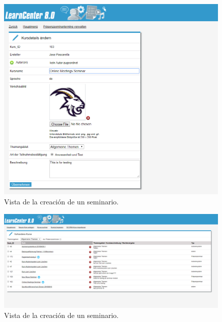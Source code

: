 \begin{figure}[h]
	\begin{center}
		\includegraphics[width=\textwidth]{screenshots/creacion_seminario.png}
		\caption{Vista de la creación de un seminario.} \label{fig:creacionSeminario}
	\end{center}
\end{figure}

\begin{figure}[h]
	\begin{center}
		\includegraphics[width=\textwidth]{screenshots/admin_listar_cursos.png}
		\caption{Vista de la creación de un seminario.} \label{fig:listarCursos}
	\end{center}
\end{figure}

